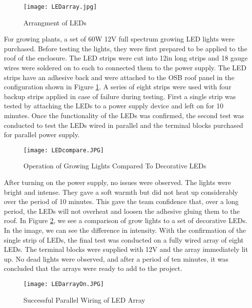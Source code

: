 \documentclass[12pt]{article} %
\begin{document}
\begin{figure}[H]
  \centering
  \texttt{[image: LEDarray.jpg]}
  \caption{Arrangment of LEDs}
  \label{fig:LEDarray}
\end{figure}

For growing plants, a set of 60W 12V full spectrum growing LED lights were purchased. Before testing the lights, they were first prepared to be applied to the roof of the enclosure. The LED strips were cut into 12in long strips and 18 gauge wires were soldered on to each to connected them to the power supply. The LED strips have an adhesive back and were attached to the OSB roof panel in the configuration shown in Figure \ref{fig:LEDarray}. A series of eight strips were used with four backup strips applied in case of failure during testing. First a single strip was tested by attaching the LEDs to a power supply device and left on for 10 minutes. Once the functionality of the LEDs was confirmed, the second test was conducted to test the LEDs wired in parallel and the terminal blocks purchased for parallel power supply. 

\begin{figure}[H]
  \centering
  \texttt{[image: LEDcompare.JPG]}
  \caption{Operation of Growing Lights Compared To Decorative LEDs}
  \label{fig:Comparison}
\end{figure}

After turning on the power supply, no issues were observed. The lights were bright and intense. They gave a soft warmth but did not heat up considerably over the period of 10 minutes. This gave the team confidence that, over a long period, the LEDs will not overheat and loosen the adhesive gluing them to the roof. In Figure \ref{fig:Comparison}, we see a comparison of grow lights to a set of decorative LEDs. In the image, we can see the difference in intensity. With the confirmation of the single strip of LEDs, the final test was conducted on a fully wired array of eight LEDs. The terminal blocks were supplied with 12V and the array immediately lit up. No dead lights were observed, and after a period of ten minutes, it was concluded that the arrays were ready to add to the project. 

\begin{figure}[H]
  \centering
  \texttt{[image: LEDarrayOn.JPG]}
  \caption{Successful Parallel Wiring of LED Array}
  \label{fig:Light Array On}
\end{figure}
\end{document}
